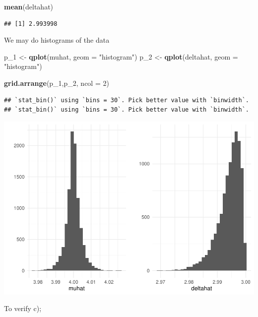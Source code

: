 \documentclass[
]{article}
\newenvironment{Shaded}{\begin{snugshade}}{\end{snugshade}}
\newcommand{\DataTypeTok}[1]{\textcolor[rgb]{0.13,0.29,0.53}{#1}}
\newcommand{\DecValTok}[1]{\textcolor[rgb]{0.00,0.00,0.81}{#1}}
\newcommand{\KeywordTok}[1]{\textcolor[rgb]{0.13,0.29,0.53}{\textbf{#1}}}
\newcommand{\NormalTok}[1]{#1}
\newcommand{\StringTok}[1]{\textcolor[rgb]{0.31,0.60,0.02}{#1}}
\begin{document}
\begin{Shaded}
\begin{Highlighting}[]
\KeywordTok{mean}\NormalTok{(deltahat)}
\end{Highlighting}
\end{Shaded}

\begin{verbatim}
## [1] 2.993998
\end{verbatim}

We may do histograms of the data

\begin{Shaded}
\begin{Highlighting}[]
\NormalTok{p_}\DecValTok{1}\NormalTok{ <-}\StringTok{ }\KeywordTok{qplot}\NormalTok{(muhat, }\DataTypeTok{geom =} \StringTok{"histogram"}\NormalTok{)}
\NormalTok{p_}\DecValTok{2}\NormalTok{ <-}\StringTok{ }\KeywordTok{qplot}\NormalTok{(deltahat, }\DataTypeTok{geom =} \StringTok{"histogram"}\NormalTok{)}

\KeywordTok{grid.arrange}\NormalTok{(p_}\DecValTok{1}\NormalTok{,p_}\DecValTok{2}\NormalTok{, }\DataTypeTok{ncol =} \DecValTok{2}\NormalTok{)}
\end{Highlighting}
\end{Shaded}

\begin{verbatim}
## `stat_bin()` using `bins = 30`. Pick better value with `binwidth`.
## `stat_bin()` using `bins = 30`. Pick better value with `binwidth`.
\end{verbatim}

\includegraphics{matstatproblems20-21_files/figure-latex/unnamed-chunk-131-1.pdf}

To verify c);
\end{document}
